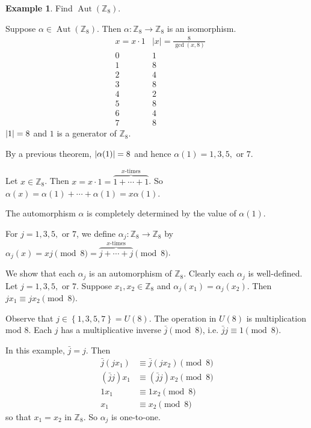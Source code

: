 \documentclass[11pt]{article}
\newcommand{\br}[1]{\left(#1\right)}
\newcommand{\cbr}[1]{\left\{#1\right\}}
\DeclareMathOperator\Aut{Aut}
\theoremstyle{remark}
\theoremstyle{definition}
\theoremstyle{remark}
\theoremstyle{definition}
\newtheorem*{example}{Example}
\theoremstyle{remark}
\begin{document}
\begin{example}
  Find $\Aut(\mathbb{Z}_8)$.

  Suppose $\alpha\in\Aut(\mathbb{Z}_8)$. Then $\alpha : \mathbb{Z}_8\to \mathbb{Z}_8$ is an isomorphism. \begin{align*}
    &x = x\cdot 1 &|x| = \frac{8}{\gcd(x,8)}\\
    &0 &1 \\
    &1 &8 \\
    &2 &4 \\
    &3 &8 \\
    &4 &2 \\
    &5 &8 \\
    &6 &4 \\
    &7 &8 
  \end{align*}
  $\abs{1} = 8$ and $1$ is a generator of $\mathbb{Z}_8$.
  
  By a previous theorem, $\abs{\alpha(1)} = 8$ and hence $\alpha(1) = 1,3,5,$ or $7$.

  Let $x\in\mathbb{Z}_8$. Then $x = x\cdot 1 = \overbrace{1+\cdots+ 1}^{x\text{-times}}$. So $\alpha(x) = \alpha(1) + \cdots + \alpha(1) = x\alpha(1)$.

  The automorphism $\alpha$ is completely determined by the value of $\alpha(1)$.

  For $j = 1,3,5,$ or $7$, we define $\alpha_j : \mathbb{Z}_8 \to \mathbb{Z}_8$ by $\alpha_j(x) = xj \pmod{8} = \overbrace{j+\cdots+ j}^{x\text{-times}}\pmod{8}$.

  We show that each $\alpha_j$ is an automorphism of $\mathbb{Z}_8$. Clearly each $\alpha_j$ is well-defined. Let $j = 1,3,5,$ or $7$. Suppose $x_1,x_2\in\mathbb{Z}_8$ and $\alpha_j(x_1) = \alpha_j(x_2)$. Then $jx_1 \equiv jx_2 \pmod{8}$.

  Observe that $j\in\cbr{1,3,5,7} = U(8)$. The operation in $U(8)$ is multiplication mod $8$. Each $j$ has a multiplicative inverse $\bar{j} \pmod{8}$, i.e. $\bar{j}j \equiv 1 \pmod{8}$.

  In this example, $\bar{j} = j$. Then \begin{align*}
    \bar{j}\br{jx_1} &\equiv \bar{j}\br{jx_2}\pmod{8} \\
    \br{\bar{j}j}x_1 &\equiv \br{\bar{j}j}x_2\pmod{8} \\
    1x_1 &\equiv 1x_2\pmod{8} \\
    x_1 &\equiv x_2\pmod{8}
  \end{align*} so that $x_1=x_2$ in $\mathbb{Z}_8$. So $\alpha_j$ is one-to-one. 


\end{example}
\end{document}
